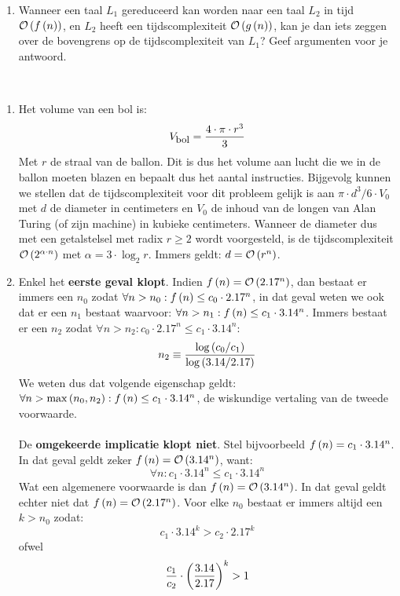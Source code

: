 \documentclass{article}
\begin{document}
\begin{question}[Complexiteitstheorie]
\begin{enumerate}
\item Wanneer een taal $L_1$ gereduceerd kan worden naar een taal
$L_2$ in tijd $\mathcal{O}\left( f\left( n \right) \right)$, en $L_2$ heeft een
tijdscomplexiteit $\mathcal{O}\left( g\left( n \right) \right)$, kan je dan iets zeggen over de
bovengrens op de tijdscomplexiteit van $L_1$? Geef argumenten voor je antwoord.
\end{enumerate}
\begin{answer}
~~
\begin{enumerate}
 \item Het volume van een bol is:
 \begin{equation}
  V_{\mbox{\small bol}}=\displaystyle\frac{4\cdot\pi\cdot r^3}{3}
 \end{equation}
Met $r$ de straal van de ballon. Dit is dus het volume aan lucht die we in de ballon moeten
blazen en bepaalt dus het aantal instructies. Bijgevolg kunnen we stellen dat de tijdscomplexiteit
voor dit probleem gelijk is aan $\pi\cdot d^3/6\cdot V_0$ met $d$ de diameter in centimeters en $V_0$
de inhoud van de longen van Alan Turing (of zijn machine) in kubieke centimeters. Wanneer de diameter dus met een getalstelsel met radix $r\geq2$ wordt
voorgesteld, is de tijdscomplexiteit $\mathcal{O}\left( 2^{\alpha\cdot n} \right)$ met $\alpha=3\cdot\log_2 r$. Immers geldt: $d=\mathcal{O}\left( r^n \right)$.
 \item Enkel het \textbf{eerste geval klopt}. Indien $f\left( n \right)=\mathcal{O}\left( 2.17^n \right)$, dan bestaat er immers een $n_0$ zodat
 $\forall n>n_0:f\left( n \right)\leq c_0\cdot2.17^n$, in dat geval weten we ook dat er een $n_1$ bestaat waarvoor:
 $\forall n>n_1:f\left( n \right)\leq c_1\cdot3.14^n$. Immers bestaat er een $n_2$ zodat $\forall n>n_2:c_0\cdot 2.17^n\leq c_1\cdot3.14^n$:
 \begin{equation}
  n_2\equiv\displaystyle\frac{\fun{\log}{c_0/c_1}}{\fun{\log}{3.14/2.17}}\eqnlab{ntwo}
 \end{equation}
We weten dus dat volgende eigenschap geldt: $\forall n>\max\left( n_0,n_2 \right):f\left( n \right)\leq c_1\cdot 3.14^n$, de wiskundige
vertaling van de tweede voorwaarde.
\paragraph{}
De \textbf{omgekeerde implicatie klopt niet}. Stel bijvoorbeeld $f\left( n \right)=c_1\cdot 3.14^n$. In dat geval geldt zeker $f\left( n \right)=\mathcal{O}\left( 3.14^n \right)$, want:
\begin{equation}
\forall n:c_1\cdot 3.14^n\leq c_1\cdot 3.14^n
\end{equation}
Wat een algemenere voorwaarde is dan $f\left( n \right)=\mathcal{O}\left( 3.14^n \right)$. In dat geval geldt echter niet dat $f\left( n \right)=\mathcal{O}\left( 2.17^n \right)$. Voor elke $n_0$ bestaat er immers altijd een $k>n_0$ zodat:
\begin{equation}
c_1\cdot 3.14^k>c_2\cdot 2.17^k
\end{equation}
ofwel
\begin{equation}
\dfrac{c_1}{c_2}\cdot\left( \dfrac{3.14}{2.17} \right)^k>1
\end{equation}


\end{enumerate}
\end{answer}
\end{question}
\end{document}
